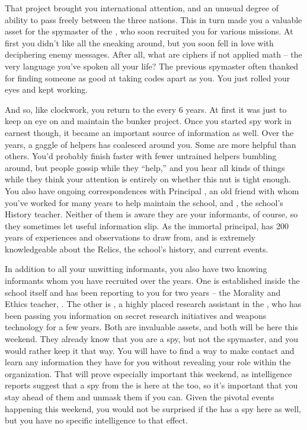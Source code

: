 \documentclass[char]{GL2020}
\begin{document}
That project brought you international attention, and an unusual degree of ability to pass freely between the three nations. This in turn made you a valuable asset for the spymaster of the \pShip{}, who soon recruited you for various missions. At first you didn't like all the sneaking around, but you soon fell in love with deciphering enemy messages. After all, what are ciphers if not applied math -- the very language you've spoken all your life? The previous spymaster often thanked \cEbb{} for finding someone as good at taking codes apart as you. You just rolled your eyes and kept working.

And so, like clockwork, you return to the \pSchool{} every 6 years. At first it was just to keep an eye on and maintain the bunker project. Once you started spy work in earnest though, it became an important source of information as well. Over the years, a gaggle of helpers has coalesced around you. Some are more helpful than others. You'd probably finish faster with fewer untrained helpers bumbling around, but people gossip while they ``help,'' and you hear all kinds of things while they think your attention is entirely on whether this nut is tight enough. You also have ongoing correspondences with Principal \cPrincipal{\full}, an old friend with whom you've worked for many years to help maintain the school, and \cHistory{\full}, the school's History teacher. Neither of them is aware they are your informants, of course, so they sometimes let useful information slip. As the immortal principal, \cPrincipal{} has 200 years of experiences and observations to draw from, and \cHistory{} is extremely knowledgeable about the Relics, the school's history, and current events. 

In addition to all your unwitting informants, you also have two knowing informants whom you have recruited over the years. One is established inside the school itself and has been reporting to you for two years – the Morality and Ethics teacher, \cEthics{\full}. The other is \cAssistantScientist{\full}, a highly placed research assistant in the \pTech{}, who has been passing you information on secret research initiatives and weapons technology for a few years. Both are invaluable assets, and both will be here this weekend. They already know that you are a \pShip{} spy, but not the spymaster, and you would rather keep it that way. You will have to find a way to make contact and learn any information they have for you without revealing your role within the organization. That will prove especially important this weekend, as intelligence reports suggest that a spy from the \pFarm{} is here at the \pSc{} too, so it's important that you stay ahead of them and unmask them if you can. Given the pivotal events happening this weekend, you would not be surprised if the \pTech{} has a spy here as well, but you have no specific intelligence to that effect.
\end{document}
